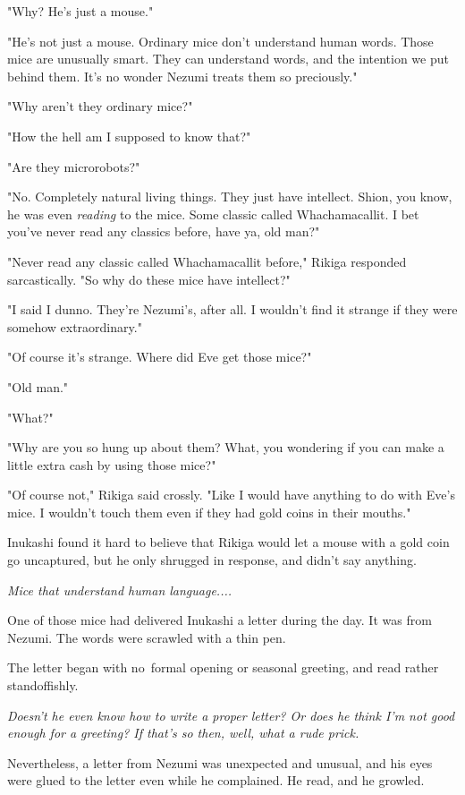 "Why? He's just a mouse."

"He's not just a mouse. Ordinary mice don't understand human words.
Those mice are unusually smart. They can understand words, and the
intention we put behind them. It's no wonder Nezumi treats them so
preciously."

"Why aren't they ordinary mice?"

"How the hell am I supposed to know that?"

"Are they microrobots?"

"No. Completely natural living things. They just have intellect. Shion,
you know, he was even \emph{reading} to the mice. Some classic called
Whachamacallit. I bet you've never read any classics before, have ya,
old man?"

"Never read any classic called Whachamacallit before," Rikiga responded
sarcastically. "So why do these mice have intellect?"

"I said I dunno. They're Nezumi's, after all. I wouldn't find it strange
if they were somehow extraordinary."

"Of course it's strange. Where did Eve get those mice?"

"Old man."

"What?"

"Why are you so hung up about them? What, you wondering if you can make
a little extra cash by using those mice?"

"Of course not," Rikiga said crossly. "Like I would have anything to do
with Eve's mice. I wouldn't touch them even if they had gold coins in
their mouths."

Inukashi found it hard to believe that Rikiga would let a mouse with a
gold coin go uncaptured, but he only shrugged in response, and didn't
say anything.

\emph{Mice that understand human language....}

One of those mice had delivered Inukashi a letter during the day. It was
from Nezumi. The words were scrawled with a thin pen.


The letter began with no~formal opening or seasonal greeting, and read
rather standoffishly.

\emph{Doesn't he even know how to write a proper letter? Or does he think I'm
	not good enough for a greeting? If that's so then, well, what a rude
	prick.}

Nevertheless, a letter from Nezumi was unexpected and unusual, and his
eyes were glued to the letter even while he complained. He read, and he
growled.

